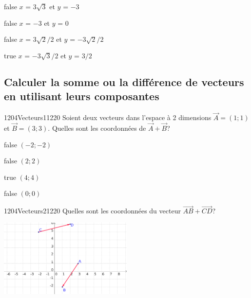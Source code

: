 \documentclass[11pt]{article}
\begin{document}
            \begin{reponses}
                \item[false] $x$ = $3\sqrt{3}$ et $y$ = $-3$
                \item[false] $x$ = $-3$ et $y$ = $0$
                \item[false] $x$ = $3\sqrt{2}/2$ et $y$ = $-3\sqrt{2}/2$
                \item[true] $x$ = $-3\sqrt{3}/2$ et $y$ = $3/2$
            \end{reponses}

        \subsection{Calculer la somme ou la différence de vecteurs en utilisant leurs composantes}
        
        	\begin{question}{1204}{Vecteurs}{1}{1220}
            	Soient deux vecteurs dans l'espace à 2 dimensions $\vec{A}=(1;1)$ et $\vec{B}=(3;3)$. Quelles sont les coordonnées de $\vec{A}+\vec{B}$?
            \end{question}

            \begin{reponses}
            	\item[false] $(-2;-2)$
            	\item[false] $(2;2)$
                \item[true] $(4;4)$
                \item[false] $(0;0)$
            \end{reponses}

            \begin{question}{1204}{Vecteurs}{2}{1220}
                Quelles sont les coordonnées du vecteur $\vec{AB}+\vec{CD}$?
                \begin{center}
                	\includegraphics[width=0.5\textwidth]{Philippe/Figures_Philippe/vecteurs_4_4.png}
                \end{center}
            \end{question}
\end{document}
